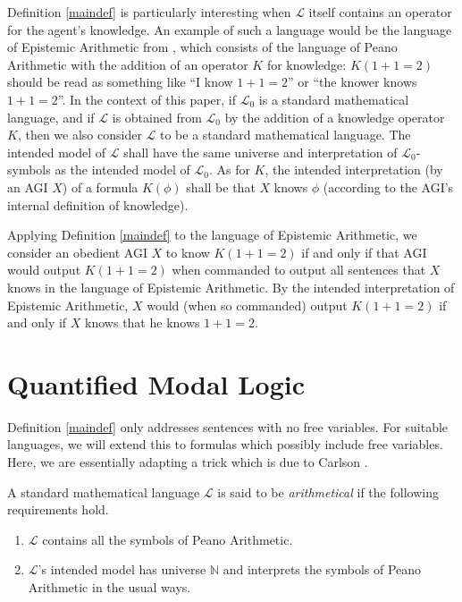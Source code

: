\documentclass[runningheads]{llncs}
\begin{document}
Definition \ref{maindef} is particularly interesting when $\mathscr L$ itself
contains an operator for the agent's knowledge. An example of such a language would be
the language of Epistemic Arithmetic from \cite{shapiro}, which consists of the
language of Peano Arithmetic with the addition of an operator $K$ for knowledge:
$K(1+1=2)$ should be read as something like
``I know $1+1=2$'' or ``the knower knows $1+1=2$''. In the context of this paper,
if $\mathscr L_0$ is a standard mathematical language, and if $\mathscr L$ is obtained
from $\mathscr L_0$ by the addition of a knowledge operator $K$, then we also
consider $\mathscr L$ to be a standard mathematical language. The intended model
of $\mathscr L$ shall have the same universe and interpretation of
$\mathscr L_0$-symbols as the intended model of $\mathscr L_0$. As for $K$,
the intended interpretation (by an AGI $X$) of a formula $K(\phi)$ shall be
that $X$ knows $\phi$ (according to the AGI's internal definition of knowledge).

\begin{example}
Applying Definition \ref{maindef} to the language of Epistemic Arithmetic,
we consider an obedient AGI $X$ to know $K(1+1=2)$ if and only if that AGI would output
$K(1+1=2)$ when commanded to output all sentences that $X$ knows in the language of
Epistemic Arithmetic. By the intended interpretation of
Epistemic Arithmetic, $X$ would (when so commanded)
output $K(1+1=2)$ if and only if $X$ knows that he knows $1+1=2$.
\end{example}

\section{Quantified Modal Logic}
\label{quantifiedsection}

Definition \ref{maindef} only addresses sentences with no free variables.
For suitable languages, we will extend this to formulas which possibly include
free variables. Here, we are essentially adapting a trick which is due to
Carlson \cite{carlson}.

\begin{definition}
  A standard mathematical language $\mathscr L$ is said to be \emph{arithmetical}
  if the following requirements hold.
  \begin{enumerate}
    \item $\mathscr L$ contains all the symbols of Peano Arithmetic.
    \item $\mathscr L$'s intended model has universe $\mathbb N$ and interprets
    the symbols of Peano Arithmetic in the usual ways.
  \end{enumerate}
\end{definition}
\end{document}
